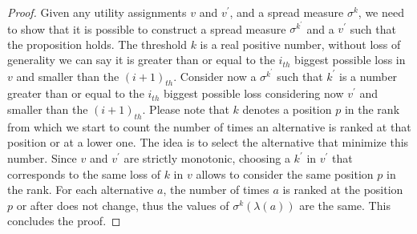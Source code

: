 \documentclass[version=3.21, pagesize, notitlepage, twoside=off, bibliography=totoc, DIV=calc, fontsize=12pt, a4paper]{scrartcl}
\begin{document}
\begin{proof}
Given any utility assignments $v$ and $v^{\prime}$, and a spread measure $\sigma^k$, we need to show that it is possible to construct a spread measure $\sigma^{k^\prime}$ and a $v^\prime$ such that the proposition holds. The threshold $k$ is a real positive number, without loss of generality we can say it is greater than or equal to the $i_{th}$ biggest possible loss in $v$ and smaller than the $(i+1)_{th}$. Consider now a $\sigma^{k^\prime}$ such that $k^\prime$ is a number greater than or equal to the $i_{th}$ biggest possible loss considering now $v^\prime$ and smaller than the $(i+1)_{th}$. Please note that $k$ denotes a position $p$ in the rank from which we start to count the number of times an alternative is ranked at that position or at a lower one. The idea is to select the alternative that minimize this number. Since $v$ and $v^{\prime}$ are strictly monotonic, choosing a $k^\prime$ in $v^\prime$ that corresponds to the same loss of $k$ in $v$ allows to consider the same position $p$ in the rank. For each alternative $a$, the number of times $a$ is ranked at the position $p$ or after does not change, thus the values of $\sigma^k (\lambda(a))$ are the same. This concludes the proof.  
\end{proof}
\end{document}
